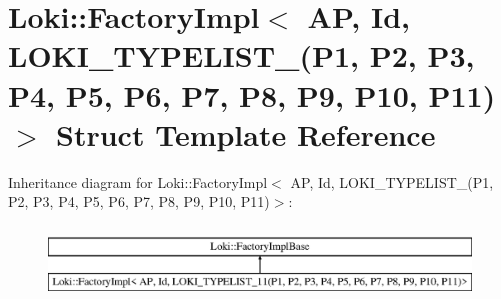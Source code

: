 \hypertarget{structLoki_1_1FactoryImpl_3_01AP_00_01Id_00_01LOKI__TYPELIST__11_07P1_00_01P2_00_01P3_00_01P4_0057b58833803e40340e0ecec150a877a5}{}\section{Loki\+:\+:Factory\+Impl$<$ A\+P, Id, L\+O\+K\+I\+\_\+\+T\+Y\+P\+E\+L\+I\+S\+T\+\_(P1, P2, P3, P4, P5, P6, P7, P8, P9, P10, P11)$>$ Struct Template Reference}
\label{structLoki_1_1FactoryImpl_3_01AP_00_01Id_00_01LOKI__TYPELIST__11_07P1_00_01P2_00_01P3_00_01P4_0057b58833803e40340e0ecec150a877a5}
Inheritance diagram for Loki\+:\+:Factory\+Impl$<$ A\+P, Id, L\+O\+K\+I\+\_\+\+T\+Y\+P\+E\+L\+I\+S\+T\+\_(P1, P2, P3, P4, P5, P6, P7, P8, P9, P10, P11)$>$\+:\begin{figure}[H]
\begin{center}
\leavevmode
\includegraphics[height=1.968366cm]{structLoki_1_1FactoryImpl_3_01AP_00_01Id_00_01LOKI__TYPELIST__11_07P1_00_01P2_00_01P3_00_01P4_0057b58833803e40340e0ecec150a877a5}
\end{center}
\end{figure}
